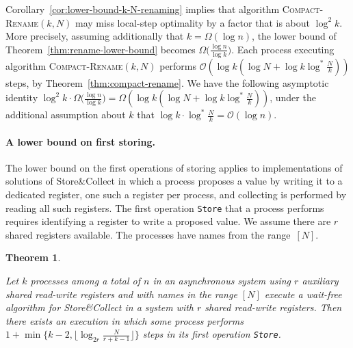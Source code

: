 \documentclass[11pt]{article}
\newcommand{\BBB}{\vspace*{-\bigskipamount}}
\newcommand{\cO}{\mathcal{O}}
\newcommand{\Paragraph}[1]{\BBB\paragraph{#1}}
\newtheorem{theorem}{Theorem}
\begin{document}
Corollary~\ref{cor:lower-bound-k-N-renaming} implies that algorithm \textsc{Compact-Rename}$(k,N)$ may miss local-step optimality by a factor that is about $\log ^2 k$.
More precisely, assuming additionally that $k=\Omega(\log n)$, the lower bound of Theorem~\ref{thm:rename-lower-bound} becomes $\Omega\bigl(\frac{\log n}{\log k}\bigr)$. Each process executing algorithm \textsc{Compact-Rename}$(k,N)$  performs  $\cO(\log k (\log N + \log k\log^* \frac{N}{k}))$ steps, by Theorem~\ref{thm:compact-rename}. 
We have the following asymptotic  identity $\log ^2 k \cdot \Omega\bigl(\frac{\log n}{\log k}\bigr) =\Omega(\log k (\log N + \log k\log^* \frac{N}{k}))$, under the additional assumption about $k$ that $\log k\cdot \log^* \frac{N}{k} =\cO(\log n)$.




\Paragraph{A lower bound on first storing.}


The lower bound on the first operations of storing applies to implementations of solutions of Store\&Collect in which a process proposes a value by writing it to a dedicated register, one such a register per process, and collecting is performed by reading all such registers.
The first operation \texttt{Store} that a process performs requires identifying a register to write a proposed value. 
We assume there are $r$ shared registers available.
The processes have names from the range~$[N]$.




\begin{theorem}
\label{thm:store-collect-lower-bound}

Let $k$ processes among a total of $n$ in an asynchronous system using $r$ auxiliary shared read-write registers and with names in the range $[N]$ execute a wait-free algorithm for Store\&Collect in a system with $r$ shared read-write registers. 
Then there exists an execution in which some process performs $1+\min\{k-2,\lfloor\log_{2r} \frac{N}{r+k-1}\rfloor\}$ steps in its first operation \texttt{Store}.
\end{theorem}
\end{document}
